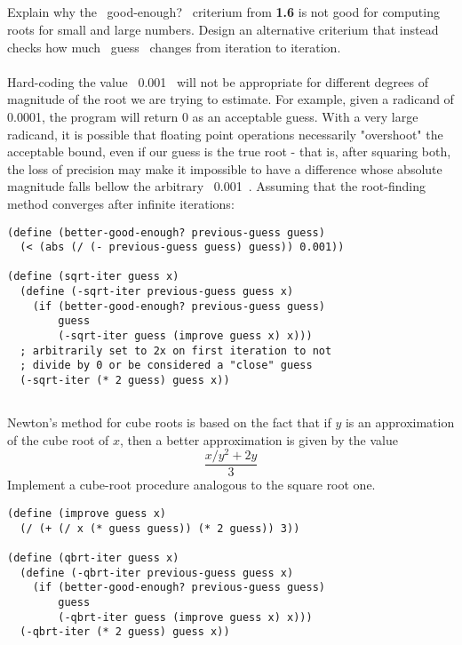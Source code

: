 \documentclass{article}
\begin{document}
\pagebreak
\subsection{}
Explain why the ~good-enough?~ criterium from \textbf{1.6} is not good for computing roots for small and large numbers. Design an alternative criterium that instead checks how much ~guess~ changes from iteration to iteration.\\ \\
Hard-coding the value ~0.001~ will not be appropriate for different degrees of magnitude of the root we are trying to estimate. For example, given a radicand of 0.0001, the program will return 0 as an acceptable guess. With a very large radicand, it is possible that floating point operations necessarily "overshoot" the acceptable bound, even if our guess is the true root - that is, after squaring both, the loss of precision may make it impossible to have a difference whose absolute magnitude falls bellow the arbitrary ~0.001~. Assuming that the root-finding method converges after infinite iterations:
\begin{lstlisting}
(define (better-good-enough? previous-guess guess)
  (< (abs (/ (- previous-guess guess) guess)) 0.001))

(define (sqrt-iter guess x)
  (define (-sqrt-iter previous-guess guess x)
    (if (better-good-enough? previous-guess guess)
        guess
        (-sqrt-iter guess (improve guess x) x)))
  ; arbitrarily set to 2x on first iteration to not
  ; divide by 0 or be considered a "close" guess
  (-sqrt-iter (* 2 guess) guess x))
\end{lstlisting}

\subsection{}
Newton's method for cube roots is based on the fact that if $y$ is an approximation of the cube root of $x$, then a better approximation is given by the value
\[ \frac{x/y^2 + 2y}{3} \]
Implement a cube-root procedure analogous to the square root one.
\begin{lstlisting}
(define (improve guess x)
  (/ (+ (/ x (* guess guess)) (* 2 guess)) 3))

(define (qbrt-iter guess x)
  (define (-qbrt-iter previous-guess guess x)
    (if (better-good-enough? previous-guess guess)
        guess
        (-qbrt-iter guess (improve guess x) x)))
  (-qbrt-iter (* 2 guess) guess x))
\end{lstlisting}
\end{document}
